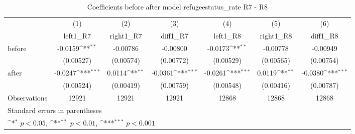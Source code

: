 \begin{table}[!ht]\centering \footnotesize
\def\sym#1{\ifmmode^{#1}\else\(^{#1}\)\fi}
\caption{Coefficients before after model refugeestatus\_rate R7 - R8}
\begin{tabular}{l*{6}{c}}
\hline\hline
                    &\multicolumn{1}{c}{(1)}&\multicolumn{1}{c}{(2)}&\multicolumn{1}{c}{(3)}&\multicolumn{1}{c}{(4)}&\multicolumn{1}{c}{(5)}&\multicolumn{1}{c}{(6)}\\
                    &\multicolumn{1}{c}{left1\_R7}&\multicolumn{1}{c}{right1\_R7}&\multicolumn{1}{c}{diff1\_R7}&\multicolumn{1}{c}{left1\_R8}&\multicolumn{1}{c}{right1\_R8}&\multicolumn{1}{c}{diff1\_R8}\\
\hline
before              &     -0.0159\sym{**} &    -0.00786         &    -0.00800         &     -0.0173\sym{**} &    -0.00778         &    -0.00949         \\
                    &   (0.00527)         &   (0.00574)         &   (0.00772)         &   (0.00529)         &   (0.00565)         &   (0.00754)         \\
[1em]
after               &     -0.0247\sym{***}&      0.0114\sym{**} &     -0.0361\sym{***}&     -0.0261\sym{***}&      0.0119\sym{**} &     -0.0380\sym{***}\\
                    &   (0.00524)         &   (0.00419)         &   (0.00759)         &   (0.00548)         &   (0.00416)         &   (0.00787)         \\
\hline
Observations        &       12921         &       12921         &       12921         &       12868         &       12868         &       12868         \\
\hline\hline
\multicolumn{7}{l}{\footnotesize Standard errors in parentheses}\\
\multicolumn{7}{l}{\footnotesize \sym{*} \(p<0.05\), \sym{**} \(p<0.01\), \sym{***} \(p<0.001\)}\\
\end{tabular}
\end{table}
